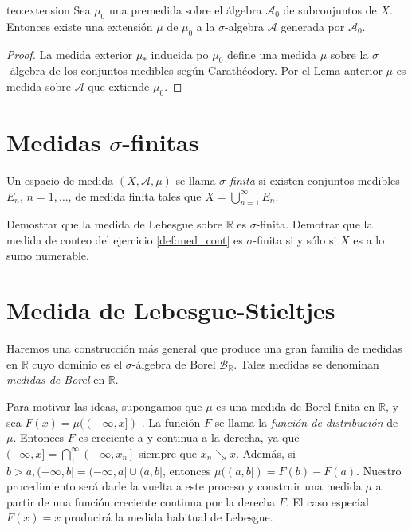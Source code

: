  
\begin{teorema}{teo:extension}
  Sea $\mu_0$ una premedida sobre el álgebra  $\mathscr{A}_0$ de subconjuntos de $X$. Entonces existe una extensión $\mu$ de $\mu_0$ a la $\sigma$-algebra   $\mathscr{A}$ generada por  $\mathscr{A}_0$.
\end{teorema}
\begin{proof}  La medida exterior $\mu_{*}$ inducida po $\mu_{0}$ define una medida $\mu$ sobre la $\sigma$-álgebra de los conjuntos medibles según  Carathéodory. Por el Lema anterior  $\mu$ es medida sobre $\mathscr{A}$ que extiende $\mu_{0}$. 

\end{proof}



\section{Medidas $\sigma$-finitas}

\begin{definicion}{} Un espacio de medida $(X,\mathcal{A},\mu)$ se llama \emph{$\sigma$-finita}  si existen conjuntos medibles $E_n$, $n=1,\ldots$, de medida finita tales que $X=\bigcup_{n=1}^{\infty}E_n$. 
 
\end{definicion}

\begin{ejercicio}{}
 Demostrar que la medida de Lebesgue sobre $\mathbb{R}$ es $\sigma$-finita. Demotrar que la medida de conteo del ejercicio \ref{def:med_cont}  es $\sigma$-finita si y sólo si $X$ es a lo sumo numerable.
\end{ejercicio}


\section{Medida de Lebesgue-Stieltjes}

Haremos una construcción más general  que produce una gran familia de medidas en $\mathbb{R}$ cuyo dominio es el $\sigma$-álgebra de Borel $\mathcal{B}_{\mathbb {R}}$. Tales medidas se denominan \emph{medidas de Borel} en $\mathbb{R}$.

Para motivar las ideas, supongamos que $\mu$ es una medida de Borel finita en $\mathbb{R}$, y sea $F(x)=\mu((-\infty, x])$ . La función $F$  se llama la \emph{función de distribución} de $\mu$.  Entonces $F$ es creciente a y continua a la derecha, ya que $(-\infty, x]=\bigcap_{1}^{\infty}\left(-\infty, x_{n}\right]$ siempre que $x_{n} \searrow x$.  Además, si $b>a,(-\infty, b]=(-\infty, a] \cup(a, b]$, entonces $\mu((a, b])=F(b) -F(a)$. Nuestro procedimiento será darle la vuelta a este proceso y construir una medida $\mu$ a partir de una función creciente continua por la derecha $F$. El caso especial $F(x)=x$ producirá la medida habitual de Lebesgue.

